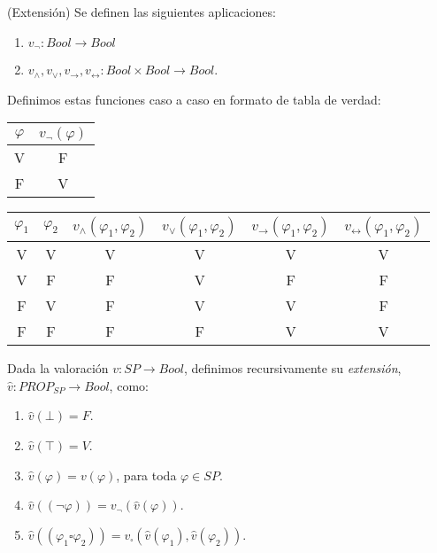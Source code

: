 \begin{definition}(Extensión) Se definen las siguientes aplicaciones:
\begin{enumerate}
    \item $v_{\neg}: Bool \rightarrow Bool$
    \item $v_\land, v_\lor, v_\rightarrow, v_\leftrightarrow: Bool \times Bool \rightarrow Bool$.
\end{enumerate}
Definimos estas funciones caso a caso en formato de tabla de verdad:
\begin{table}[htbp]
\begin{center}
\begin{tabular}{|c|c|}
\hline
$\varphi$ & $v_{\neg}(\varphi)$ \\
\hline \hline
V & F \\ \hline
F & V \\ \hline
\end{tabular}
\end{center}
\end{table}


\begin{table}[htbp]
\begin{center}
\begin{tabular}{|c|c|c|c|c|c|}
\hline
$\varphi_1$ & $\varphi_2$ & $v_{\land}(\varphi_1, \varphi_2)$ & $v_{\lor}(\varphi_1, \varphi_2)$ & $v_{\rightarrow}(\varphi_1, \varphi_2)$ & $v_{\leftrightarrow}(\varphi_1, \varphi_2)$ \\
\hline \hline
V & V & V & V & V & V\\ \hline
V & F & F & V & F & F\\ \hline
F & V & F & V & V & F\\ \hline
F & F & F & F & V & V\\ \hline
\end{tabular}
\end{center}
\end{table}

Dada la valoración $v: SP \rightarrow Bool$, definimos recursivamente su \textit{extensión}, $\hat{v}: PROP_{SP} \rightarrow Bool$, como:
\begin{enumerate}
    \item $\hat{v}(\bot) = F$.
    \item $\hat{v}(\top) = V$.
    \item $\hat{v}(\varphi) = v(\varphi)$, para toda $\varphi \in SP$.
    \item $\hat{v}((\neg \varphi)) = v_{\neg}(\hat{v}(\varphi))$.
    \item $\hat{v}((\varphi_1 \square \varphi_2)) = v_{\square}(\hat{v}(\varphi_1), \hat{v}(\varphi_2))$.
\end{enumerate}
\end{definition}

